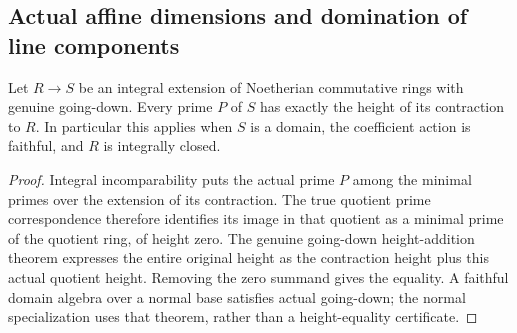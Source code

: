 \subsection{Actual affine dimensions and domination of line components}
\label{subsec:actual-affine-line-components}

\begin{theorem}
\label{algebra:integral-normal-height}
\leanok
Let $R\to S$ be an integral extension of Noetherian commutative rings
with genuine going-down. Every prime $P$ of $S$ has exactly the height
of its contraction to $R$. In particular this applies when $S$ is a
domain, the coefficient action is faithful, and $R$ is integrally closed.
\end{theorem}
\begin{proof}
Integral incomparability puts the actual prime $P$ among the minimal
primes over the extension of its contraction. The true quotient prime
correspondence therefore identifies its image in that quotient as a
minimal prime of the quotient ring, of height zero. The genuine
going-down height-addition theorem expresses the entire original height
as the contraction height plus this actual quotient height. Removing
the zero summand gives the equality. A faithful domain algebra over a
normal base satisfies actual going-down; the normal specialization uses
that theorem, rather than a height-equality certificate.
\end{proof}

